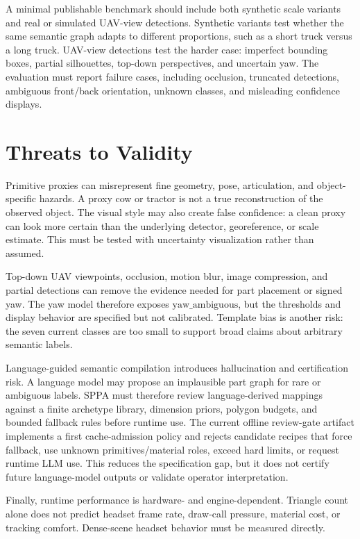 ﻿\documentclass[11pt,a4paper]{article}
\begin{document}
A minimal publishable benchmark should include both synthetic scale variants and
real or simulated UAV-view detections. Synthetic variants test whether the same
semantic graph adapts to different proportions, such as a short truck versus a
long truck. UAV-view detections test the harder case: imperfect bounding boxes,
partial silhouettes, top-down perspectives, and uncertain yaw. The evaluation
must report failure cases, including occlusion, truncated detections, ambiguous
front/back orientation, unknown classes, and misleading confidence displays.

\section{Threats to Validity}

Primitive proxies can misrepresent fine geometry, pose, articulation, and
object-specific hazards. A proxy cow or tractor is not a true reconstruction of
the observed object. The visual style may also create false confidence: a clean
proxy can look more certain than the underlying detector, georeference, or scale
estimate. This must be tested with uncertainty visualization rather than assumed.

Top-down UAV viewpoints, occlusion, motion blur, image compression, and partial
detections can remove the evidence needed for part placement or signed yaw.
The yaw model therefore exposes \(\mathrm{yaw\_ambiguous}\), but the thresholds
and display behavior are specified but not calibrated. Template bias is another risk:
the seven current classes are too small to support broad claims about arbitrary
semantic labels.

Language-guided semantic compilation introduces hallucination and certification
risk. A language model may propose an implausible part graph for rare or
ambiguous labels. SPPA must therefore review language-derived mappings against a
finite archetype library, dimension priors, polygon budgets, and bounded
fallback rules before runtime use. The current offline review-gate artifact
implements a first cache-admission policy and rejects candidate recipes that
force fallback, use unknown primitives/material roles, exceed hard limits, or
request runtime LLM use. This reduces the specification gap, but it does not
certify future language-model outputs or validate operator interpretation.

Finally, runtime performance is hardware- and engine-dependent. Triangle count
alone does not predict headset frame rate, draw-call pressure, material cost, or
tracking comfort. Dense-scene headset behavior must be measured directly.
\end{document}
